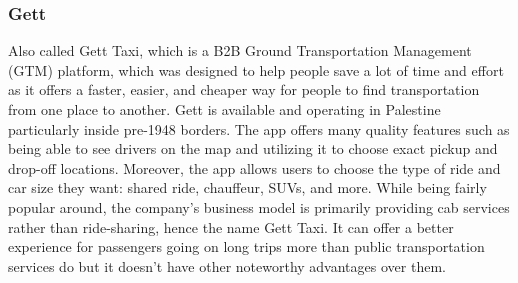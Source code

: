 \documentclass[a4paper, 12pt]{report} %
\begin{document}
            \subsubsection{Gett}
                Also called Gett Taxi, which is a B2B Ground Transportation Management (GTM) platform, which was designed to help people save a lot of time and effort as it offers a faster, easier, and cheaper way for people to find transportation from one place to another. \cite{gett_wiki,gett_news} Gett is available and operating in Palestine particularly inside pre-1948 borders. The app offers many quality features such as being able to see drivers on the map and utilizing it to choose exact pickup and drop-off locations. Moreover, the app allows users to choose the type of ride and car size they want: shared ride, chauffeur, SUVs, and more. While being fairly popular around, the company's business model is primarily providing cab services rather than ride-sharing, hence the name Gett Taxi. It can offer a better experience for passengers going on long trips more than public transportation services do but it doesn't have other noteworthy advantages over them. 
\end{document}
